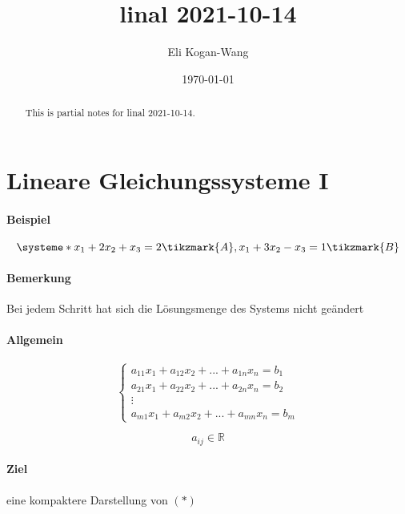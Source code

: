 \documentclass[a4paper,12pt]{article}
\title{linal 2021-10-14}
\author{Eli Kogan-Wang}
\date{\today}
\begin{document}
\renewcommand{\abstractname}{Abstract}
\begin{abstract}
  This is partial notes for linal 2021-10-14.
\end{abstract}
\section*{Lineare Gleichungssysteme I}

\paragraph*{Beispiel}

\[
  \systeme*{x_1+2x_2+x_3=2\tikzmark{A},x_1+3x_2-x_3=1\tikzmark{B}}
\]


\paragraph*{Bemerkung} Bei jedem Schritt hat sich die Lösungsmenge des Systems nicht geändert

\paragraph*{Allgemein}

\[
  \left\{
  \begin{aligned}
    a_{11}x_{1}+a_{12}x_{2}+...+a_{1n}x_{n}=b_{1} \\
    a_{21}x_{1}+a_{22}x_{2}+...+a_{2n}x_{n}=b_{2} \\
    \vdots                                        \\
    a_{m1}x_{1}+a_{m2}x_{2}+...+a_{mn}x_{n}=b_{m}
  \end{aligned}
  \right.
  \tag{*}
\]

$$a_{ij}\in\mathbb{R}$$

\paragraph*{Ziel} eine kompaktere Darstellung von ${(*)}$
\end{document}
